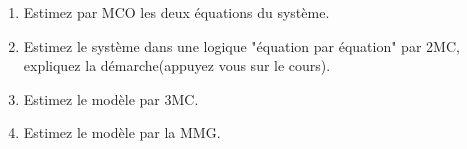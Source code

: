 \begin{enumerate}
\item Estimez par MCO les deux équations du système. 
\item Estimez le système dans une logique "équation par équation" par 2MC, 
expliquez la démarche(appuyez vous sur le cours).
\item Estimez le modèle par 3MC. 
\item Estimez le modèle par la MMG.
\end{enumerate}
















 
